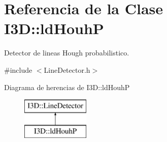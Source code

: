 \hypertarget{class_i3_d_1_1ld_houh_p}{}\section{Referencia de la Clase I3D\+:\+:ld\+HouhP}
\label{class_i3_d_1_1ld_houh_p}


Detector de lineas Hough probabilistico.  




{\ttfamily \#include $<$Line\+Detector.\+h$>$}

Diagrama de herencias de I3D\+:\+:ld\+HouhP\begin{figure}[H]
\begin{center}
\leavevmode
\includegraphics[height=2.000000cm]{class_i3_d_1_1ld_houh_p}
\end{center}
\end{figure}
